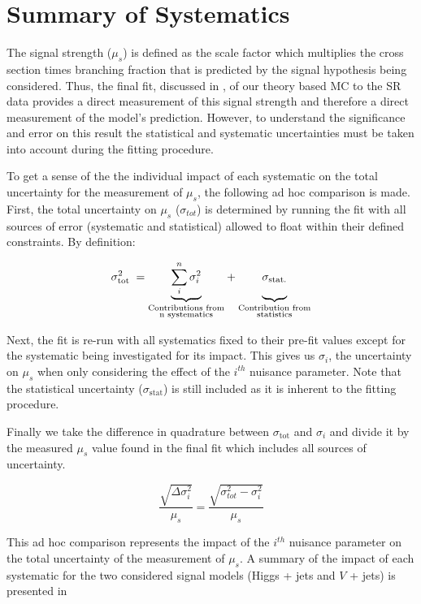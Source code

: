 \section{Summary of Systematics} \label{sec:systematics:summary}

The signal strength ($\mu_{s}$) is defined as the scale factor which multiplies
the cross section times branching fraction that is predicted by the signal
hypothesis being considered.  Thus, the final fit, discussed in
, of our theory based MC to the SR data provides a direct
measurement of this signal strength and therefore a direct measurement of the
model's prediction. However, to understand the significance and error on this
result the statistical and systematic uncertainties must be taken into account
during the fitting procedure.

To get a sense of the the individual impact of each systematic on the total
uncertainty for the measurement of $\mu_{s}$, the following ad hoc comparison
is made.  First, the total uncertainty on $\mu_{s}$ ($\sigma_{tot}$) is
determined by running the fit with all sources of error (systematic and
statistical) allowed to float within their defined constraints.  By definition:

$$ \sigma_{\text{tot}}^{2} \; = {\underbrace{\sum_{i}^{n} \sigma_{i}^{2}}_{\substack{\text{Contributions from} \\ \text{n systematics}}}} + {\underbrace{\vphantom{\sum_{i}^{n}} \sigma_{\text{stat.}}}_{\substack{\text{Contribution from} \\ \text{statistics}}}}$$

Next, the fit is re-run with all systematics fixed to their pre-fit values
except for the systematic being investigated for its impact. This gives us
$\sigma_{i}$, the uncertainty on $\mu_{s}$ when only considering the effect of
the $i^{th}$ nuisance parameter. Note that the statistical uncertainty
($\sigma_{\text{stat}}$) is still included as it is inherent to the fitting
procedure.

Finally we take the difference in quadrature between $\sigma_{\text{tot}}$ and
$\sigma_{i}$ and divide it by the measured $\mu_{s}$ value found in the final
fit which includes all sources of uncertainty. 

$$ \frac{\sqrt{\Delta \sigma_i^2}}{\mu_{s}} = \frac{\sqrt{\sigma_{tot}^2 - \sigma_i^2}}{\mu_{s}} $$

This ad hoc comparison represents the impact of the $i^{th}$ nuisance parameter
on the total uncertainty of the measurement of $\mu_{s}$. A summary of the
impact of each systematic for the two considered signal models (Higgs + jets
and $V$ + jets) is presented in 

